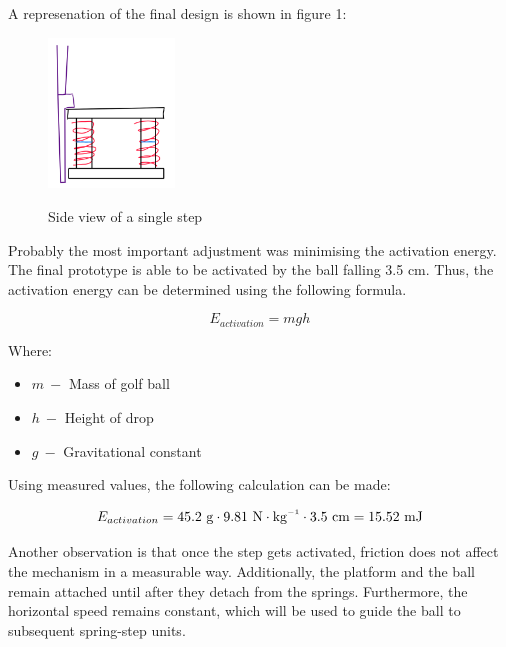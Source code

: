 \documentclass[a4paper]{article}
\newcommand{\inv}{^{\raisebox{.2ex}{$\scriptscriptstyle-1$}}}
\newcommand{\unit}[1]{~\mathrm{#1}}
\begin{document}
\newpage 
A represenation of the final design is shown in figure 1:
\begin{figure}[!ht]
    \centering
    \includegraphics[width = 0.3\textwidth]{picture.png}
    \label{fig:step}
    \caption{Side view of a single step}
\end{figure}

Probably the most important
adjustment was minimising the activation energy. The final prototype is able to
be activated by the ball falling 3.5 cm. Thus, the activation energy can be
determined using the following formula.

\begin{equation}
    E_{activation} = mgh
\end{equation}

Where:
\begin{itemize}
    \item $m ~-$ Mass of golf ball
    \item $h ~-$ Height of drop
    \item $g ~-$ Gravitational constant
\end{itemize}

Using measured values, the following calculation can be made:

\[ E_{activation} = 45.2\unit{g} \cdot 9.81\unit{N\cdot  kg\inv} \cdot 3.5\unit{cm} =
15.52\unit{mJ}\]

Another observation is that once the step gets activated, friction does not
affect the mechanism in a measurable way. Additionally, the platform and the
ball remain attached until after they detach from the springs. Furthermore, the
horizontal speed remains constant, which will be used to guide the ball to
subsequent spring-step units. 
\end{document}
